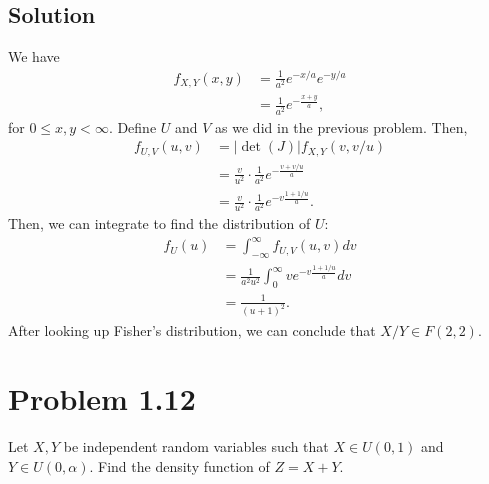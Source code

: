 \documentclass[10pt,a4paper]{article}
\theoremstyle{theorem}
\theoremstyle{definition}
\begin{document}
\subsection*{Solution}
We have
\begin{align*}
f_{X, Y} (x, y) &= \frac{1}{a^2} e^{-x/a} e^{-y/a}\\
&= \frac{1}{a^2} e^{-\frac{x + y}{a}},
\end{align*}
for $0 \leq x, y < \infty$. Define $U$ and $V$ as we did in the previous problem. Then,
\begin{align*}
f_{U, V} (u, v) &= |\det(J)| f_{X, Y} (v, v/u)\\
&= \frac{v}{u^2} \cdot \frac{1}{a^2} e^{-\frac{v + v/u}{a}}\\
&=  \frac{v}{u^2} \cdot \frac{1}{a^2} e^{-v\frac{1 + 1/u}{a}}.
\end{align*}
Then, we can integrate to find the distribution of $U$:
\begin{align*}
f_U(u) &= \int_{- \infty}^\infty f_{U, V} (u, v) dv\\
&= \frac{1}{a^2 u^2} \int_{0}^\infty v e^{-v\frac{1 + 1/u}{a}} dv\\
&= \frac{1}{(u + 1)^2}.
\end{align*}
After looking up Fisher's distribution, we can conclude that $X/Y \in F(2, 2)$.


\section*{Problem 1.12}
Let $X, Y$ be independent random variables such that $X \in U(0, 1)$ and $Y \in U(0, \alpha)$. Find the density function of $Z = X + Y$.
\end{document}

